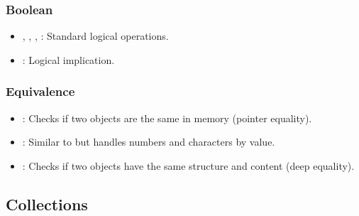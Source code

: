 \subsubsection{Boolean}
\begin{itemize}
    \item {}, , , : Standard logical operations.
    \item {}: Logical implication.
\end{itemize}

\subsubsection{Equivalence}
\begin{itemize}
    \item {}: Checks if two objects are the same in memory (pointer equality).
    \item {}: Similar to  but handles numbers and characters by value.
    \item {}: Checks if two objects have the same structure and content (deep equality).
\end{itemize}

\subsection{Collections}

